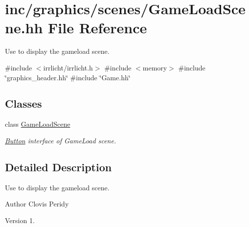 \hypertarget{GameLoadScene_8hh}{}\section{inc/graphics/scenes/\+Game\+Load\+Scene.hh File Reference}
\label{GameLoadScene_8hh}


Use to display the gameload scene.  


{\ttfamily \#include $<$irrlicht/irrlicht.\+h$>$}\newline
{\ttfamily \#include $<$memory$>$}\newline
{\ttfamily \#include \char`\"{}graphics\+\_\+header.\+hh\char`\"{}}\newline
{\ttfamily \#include \char`\"{}Game.\+hh\char`\"{}}\newline
\subsection*{Classes}
\begin{DoxyCompactItemize}
\item 
class \hyperlink{classGameLoadScene}{Game\+Load\+Scene}
\begin{DoxyCompactList}\small\item\em \hyperlink{classButton}{Button} interface of Game\+Load scene. \end{DoxyCompactList}\end{DoxyCompactItemize}


\subsection{Detailed Description}
Use to display the gameload scene. 

\begin{DoxyAuthor}{Author}
Clovis Peridy 
\end{DoxyAuthor}
\begin{DoxyVersion}{Version}
1. 
\end{DoxyVersion}
